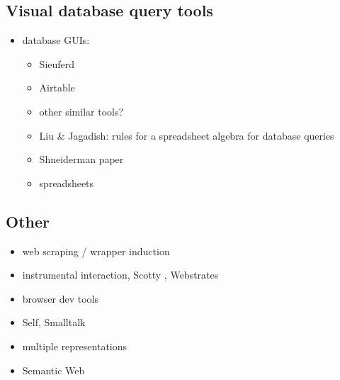 \documentclass[sigplan,10pt,anonymous,review]{acmart}
\providecommand{\tightlist}{%
  \setlength{\itemsep}{0pt}\setlength{\parskip}{0pt}}
\begin{document}
\hypertarget{visual-database-query-tools}{%
\subsection{Visual database query
tools}\label{visual-database-query-tools}}

\begin{itemize}
\tightlist
\item
  database GUIs:

  \begin{itemize}
  \tightlist
  \item
    Sieuferd \citep{bakke2016}
  \item
    Airtable \citep{2020a}
  \item
    other similar tools?
  \item
    Liu \& Jagadish: rules for a spreadsheet algebra for database
    queries \citep{liu2009}
  \item
    Shneiderman paper
  \item
    spreadsheets
  \end{itemize}
\end{itemize}

\hypertarget{other}{%
\subsection{Other}\label{other}}

\begin{itemize}
\tightlist
\item
  web scraping / wrapper induction
\item
  instrumental interaction, Scotty \citep{eagan2011}, Webstrates
\item
  browser dev tools
\item
  Self, Smalltalk
\item
  multiple representations
\item
  Semantic Web
\end{itemize}



\end{document}
